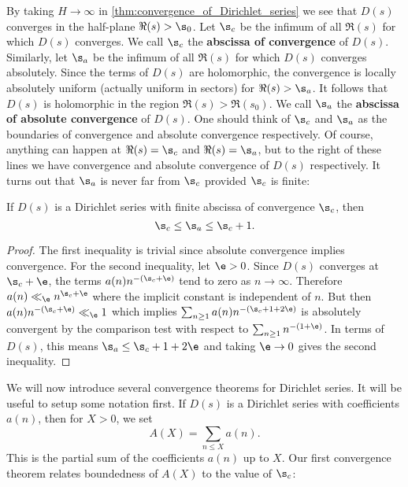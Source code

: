     By taking $H \to \infty$ in \cref{thm:convergence_of_Dirichlet_series} we see that $D(s)$ converges in the half-plane $\Re(s) > \s_{0}$. Let $\s_{c}$ be the infimum of all $\Re(s)$ for which $D(s)$ converges. We call $\s_{c}$ the \textbf{abscissa of convergence} of $D(s)$. Similarly, let $\s_{a}$ be the infimum of all $\Re(s)$ for which $D(s)$ converges absolutely. Since the terms of $D(s)$ are holomorphic, the convergence is locally absolutely uniform (actually uniform in sectors) for $\Re(s) > \s_{a}$. It follows that $D(s)$ is holomorphic in the region $\Re(s) > \Re(s_{0})$.  We call $\s_{a}$ the \textbf{abscissa of absolute convergence} of $D(s)$. One should think of $\s_{c}$ and $\s_{a}$ as the boundaries of convergence and absolute convergence respectively. Of course, anything can happen at $\Re(s) = \s_{c}$ and $\Re(s) = \s_{a}$, but to the right of these lines we have convergence and absolute convergence of $D(s)$ respectively. It turns out that $\s_{a}$ is never far from $\s_{c}$ provided $\s_{c}$ is finite:

    \begin{theorem}
      If $D(s)$ is a Dirichlet series with finite abscissa of convergence $\s_{c}$, then
      \[
        \s_{c} \le \s_{a} \le \s_{c}+1.
      \]
    \end{theorem}
    \begin{proof}
      The first inequality is trivial since absolute convergence implies convergence. For the second inequality, let $\e > 0$. Since $D(s)$ converges at $\s_{c}+\e$, the terms $a(n)n^{-(\s_{c}+\e)}$ tend to zero as $n \to \infty$. Therefore $a(n) \ll_{\e} n^{\s_{c}+\e}$ where the implicit constant is independent of $n$. But then $a(n)n^{-(\s_{c}+\e)} \ll_{\e} 1$ which implies $\sum_{n \ge 1}a(n)n^{-(\s_{c}+1+2\e)}$ is absolutely convergent by the comparison test with respect to $\sum_{n \ge 1}n^{-(1+\e)}$. In terms of $D(s)$, this means $\s_{a} \le \s_{c}+1+2\e$ and taking $\e \to 0$ gives the second inequality.
    \end{proof}

    We will now introduce several convergence theorems for Dirichlet series. It will be useful to setup some notation first. If $D(s)$ is a Dirichlet series with coefficients $a(n)$, then for $X > 0$, we set
    \[
      A(X) = \sum_{n \le X}a(n).
    \]
    This is the partial sum of the coefficients $a(n)$ up to $X$. Our first convergence theorem relates boundedness of $A(X)$ to the value of $\s_{c}$: 
    
